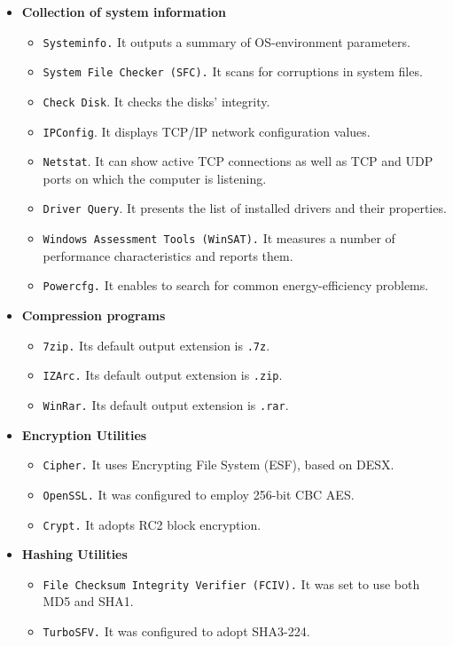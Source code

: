 \begin{itemize}
\item \textbf{Collection of system information}
	   \begin{itemize}
	   \item \texttt{Systeminfo.} It outputs a summary of OS-environment parameters. 
	   \item \texttt{System File Checker (SFC).} It scans for corruptions in system files.
	   \item \texttt{Check Disk}. It checks the disks' integrity.
	   \item \texttt{IPConfig}. It displays TCP/IP network configuration values.
	   \item \texttt{Netstat}. It can show active TCP connections as well as TCP and UDP ports on which the computer is listening.
	   \item \texttt{Driver Query}. It presents the list of installed drivers and their properties.
	   \item \texttt{Windows Assessment Tools (WinSAT).} It  measures a number of performance characteristics and reports them.
	   \item \texttt{Powercfg.} It enables to search for common energy-efficiency problems. 
	   \end{itemize}
\item \textbf{Compression programs}
		\begin{itemize}
		\item \texttt{7zip.} Its default output extension is \texttt{.7z}.
		\item \texttt{IZArc.} Its default output extension is \texttt{.zip}.
		\item \texttt{WinRar.} Its default output extension is \texttt{.rar}.
		\end{itemize}
\item \textbf{Encryption Utilities}
		\begin{itemize}
		\item \texttt{Cipher.} It uses Encrypting File System (ESF), based on DESX. 
		\item \texttt{OpenSSL.} It was configured to employ 256-bit CBC AES.
		\item \texttt{Crypt.} It adopts RC2 block encryption.
		\end{itemize}
\item \textbf{Hashing Utilities}
		\begin{itemize}
		\item \texttt{File Checksum Integrity Verifier (FCIV).} It was set to use both MD5 and SHA1.
		\item \texttt{TurboSFV.} It was configured to adopt SHA3-224. 
		\end{itemize}
\end{itemize}

